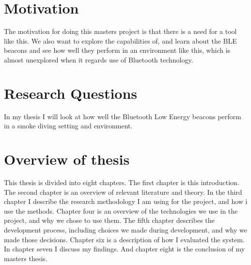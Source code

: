\documentclass[../Main/thesis.tex]{subfiles}
\begin{document}
\section{Motivation}
The motivation for doing this masters project is that there is a need for a tool like this.
We also want to explore the capabilities of, and learn about the BLE beacons and see how well they perform in an environment like this, which is almost unexplored when it regards use of Bluetooth technology. 


\section{Research Questions}
In my thesis I will look at how well the Bluetooth Low Energy beacons perform in a smoke diving setting and environment. 


\section{Overview of thesis}
This thesis is divided into eight chapters.
The first chapter is this introduction.
The second chapter is an overview of relevant literature and theory.
In the third chapter I describe the research methodology I am using for the project, and how i use the methods.
Chapter four is an overview of the technologies we use in the project, and why we chose to use them.
The fifth chapter describes the development process, including choices we made during development, and why we made those decisions.
Chapter six is a description of how I evaluated the system.
In chapter seven I discuss my findings.
And chapter eight is the conclusion of my masters thesis.




\onlyinsubfile{}
\onlyinsubfile{}
\end{document}
